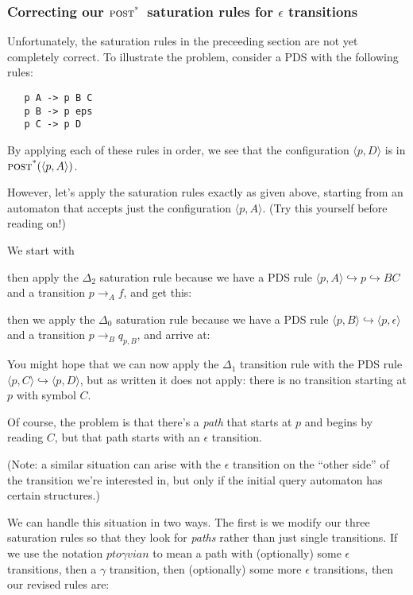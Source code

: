 \documentclass{article}
\newcommand{\Config}[2]{\ensuremath{\langle #1, #2 \rangle}}
\newcommand{\Rule}[2]{\ensuremath{#1 \hookrightarrow #2}}
\newcommand{\Trans}[3]{\ensuremath{#1 \rightarrow_{#2} #3}}
\newcommand{\epspath}[3]{\ensuremath{#1 to #2 via #3}}
\newcommand{\poststar}{\ensuremath{\textsc{post}^\textsc{*}}}
\begin{document}
\subsubsection{Correcting our \poststar\ saturation rules for $\epsilon$
  transitions}

Unfortunately, the saturation rules in the preceeding section are not
yet completely correct. To illustrate the problem, consider a PDS with
the following rules:

\begin{verbatim}
   p A -> p B C
   p B -> p eps
   p C -> p D
\end{verbatim}

By applying each of these rules in order, we see that the
configuration \Config{p}{D} is in $\poststar(\Config{p}{A})$.

However, let's apply the saturation rules exactly as given above,
starting from an automaton that accepts just the configuration
\Config{p}{A}. (Try this yourself before reading on!)

We start with

then apply the $\Delta_2$ saturation rule because we have a PDS rule
\Rule{\Config{p}{A}}{\Rule{p}{B C}} and a transition \Trans{p}{A}{f},
and get this:

then we apply the $\Delta_0$ saturation rule because we have a PDS
rule \Rule{\Config{p}{B}}{\Config{p}{\epsilon}} and a transition
\Trans{p}{B}{q_{p,B}}, and arrive at:

You might hope that we can now apply the $\Delta_1$ transition rule
with the PDS rule \Rule{\Config{p}{C}}{\Config{p}{D}}, but as written
it does not apply: there is no transition starting at $p$ with symbol
$C$.

Of course, the problem is that there's a \emph{path} that starts at
$p$ and begins by reading $C$, but that path starts with an $\epsilon$
transition.

(Note: a similar situation can arise with the $\epsilon$ transition on
the ``other side'' of the transition we're interested in, but only if
the initial query automaton has certain structures.)

We can handle this situation in two ways. The first is we modify our
three saturation rules so that they look for \emph{paths} rather than
just single transitions. If we use the notation \epspath{p}{\gamma}{n}
to mean a path with (optionally) some $\epsilon$ transitions, then a
$\gamma$ transition, then (optionally) some more $\epsilon$ transitions,
then our revised rules are:
\end{document}
